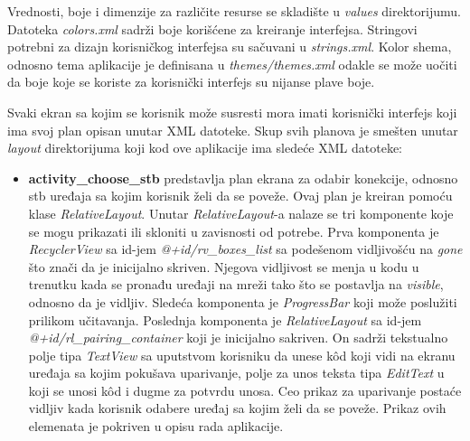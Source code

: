 \documentclass[implementacija.tex]{subfiles}
\begin{document}
Vrednosti, boje i dimenzije za različite resurse se skladište u \textit{values} direktorijumu. Datoteka \textit{colors.xml} sadrži boje korišćene za kreiranje interfejsa. Stringovi potrebni za dizajn korisničkog interfejsa su sačuvani u \textit{strings.xml}. Kolor shema, odnosno tema aplikacije je definisana u \textit{themes/themes.xml} odakle se može uočiti da boje koje se koriste za korisnički interfejs su nijanse plave boje. 

Svaki ekran sa kojim se korisnik može susresti mora imati korisnički interfejs koji ima svoj plan opisan unutar XML datoteke. Skup svih planova je smešten unutar \textit{layout} direktorijuma koji kod ove aplikacije ima sledeće XML datoteke:
\begin{itemize}
\item \textbf{activity\_choose\_stb} predstavlja plan ekrana za odabir konekcije, odnosno stb uređaja sa kojim korisnik želi da se poveže. Ovaj plan je kreiran pomoću klase \textit{RelativeLayout}. Unutar \textit{RelativeLayout}-a nalaze se tri komponente koje se mogu prikazati ili skloniti u zavisnosti od potrebe. Prva komponenta je \textit{RecyclerView} sa id-jem \textit{@+id/rv\_boxes\_list} sa podešenom vidljivošću na \textit{gone} što znači da je inicijalno skriven. Njegova vidljivost se menja u kodu u trenutku kada se pronađu uređaji na mreži tako što se postavlja na \textit{visible}, odnosno da je vidljiv. Sledeća komponenta je \textit{ProgressBar} koji može poslužiti prilikom učitavanja. Poslednja komponenta je \textit{RelativeLayout} sa id-jem \textit{@+id/rl\_pairing\_container} koji je inicijalno sakriven. On sadrži tekstualno polje tipa \textit{TextView} sa uputstvom korisniku da unese k\^{o}d koji vidi na ekranu uređaja sa kojim pokušava uparivanje, polje za unos teksta tipa \textit{EditText} u koji se unosi k\^{o}d i dugme za potvrdu unosa. Ceo prikaz za uparivanje postaće vidljiv kada korisnik odabere uređaj sa kojim želi da se poveže. Prikaz ovih elemenata je pokriven u opisu rada aplikacije.


\end{itemize}
\end{document}
